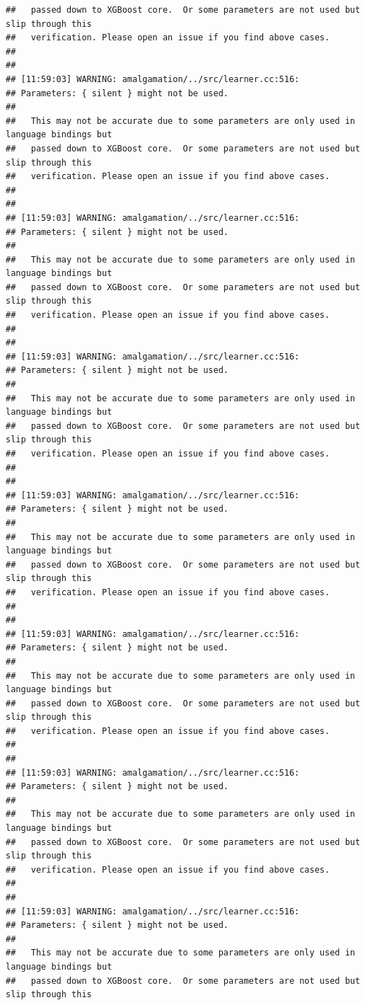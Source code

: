 \documentclass[AMS,STIX2COL]{WileyNJD-v2}\usepackage[]{graphicx}\usepackage[]{color}
\makeatletter
\newenvironment{kframe}{%
 \def\at@end@of@kframe{}%
 \ifinner\ifhmode%
  \def\at@end@of@kframe{\end{minipage}}%
  \begin{minipage}{\columnwidth}%
 \fi\fi%
 \def\FrameCommand##1{\hskip\@totalleftmargin \hskip-\fboxsep
 \colorbox{shadecolor}{##1}\hskip-\fboxsep
     \hskip-\linewidth \hskip-\@totalleftmargin \hskip\columnwidth}%
 \MakeFramed {\advance\hsize-\width
   \@totalleftmargin\z@ \linewidth\hsize
   \@setminipage}}%
 {\par\unskip\endMakeFramed%
 \at@end@of@kframe}
\newenvironment{knitrout}{}{} %
\makeatother
\begin{document}
\begin{knitrout}
\begin{kframe}
\begin{verbatim}
##   passed down to XGBoost core.  Or some parameters are not used but slip through this
##   verification. Please open an issue if you find above cases.
## 
## 
## [11:59:03] WARNING: amalgamation/../src/learner.cc:516: 
## Parameters: { silent } might not be used.
## 
##   This may not be accurate due to some parameters are only used in language bindings but
##   passed down to XGBoost core.  Or some parameters are not used but slip through this
##   verification. Please open an issue if you find above cases.
## 
## 
## [11:59:03] WARNING: amalgamation/../src/learner.cc:516: 
## Parameters: { silent } might not be used.
## 
##   This may not be accurate due to some parameters are only used in language bindings but
##   passed down to XGBoost core.  Or some parameters are not used but slip through this
##   verification. Please open an issue if you find above cases.
## 
## 
## [11:59:03] WARNING: amalgamation/../src/learner.cc:516: 
## Parameters: { silent } might not be used.
## 
##   This may not be accurate due to some parameters are only used in language bindings but
##   passed down to XGBoost core.  Or some parameters are not used but slip through this
##   verification. Please open an issue if you find above cases.
## 
## 
## [11:59:03] WARNING: amalgamation/../src/learner.cc:516: 
## Parameters: { silent } might not be used.
## 
##   This may not be accurate due to some parameters are only used in language bindings but
##   passed down to XGBoost core.  Or some parameters are not used but slip through this
##   verification. Please open an issue if you find above cases.
## 
## 
## [11:59:03] WARNING: amalgamation/../src/learner.cc:516: 
## Parameters: { silent } might not be used.
## 
##   This may not be accurate due to some parameters are only used in language bindings but
##   passed down to XGBoost core.  Or some parameters are not used but slip through this
##   verification. Please open an issue if you find above cases.
## 
## 
## [11:59:03] WARNING: amalgamation/../src/learner.cc:516: 
## Parameters: { silent } might not be used.
## 
##   This may not be accurate due to some parameters are only used in language bindings but
##   passed down to XGBoost core.  Or some parameters are not used but slip through this
##   verification. Please open an issue if you find above cases.
## 
## 
## [11:59:03] WARNING: amalgamation/../src/learner.cc:516: 
## Parameters: { silent } might not be used.
## 
##   This may not be accurate due to some parameters are only used in language bindings but
##   passed down to XGBoost core.  Or some parameters are not used but slip through this

\end{verbatim}
\end{kframe}
\end{knitrout}
\end{document}
